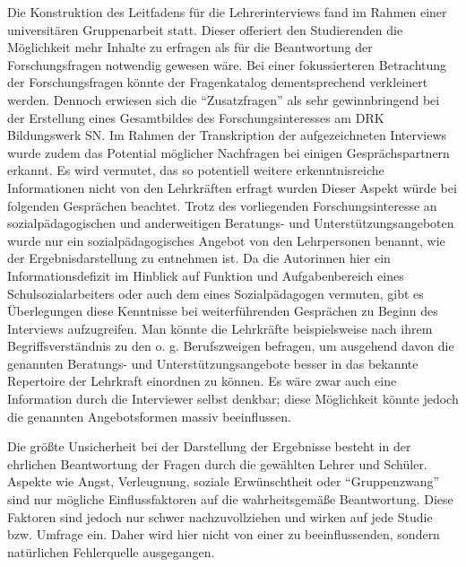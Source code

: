 Die  Konstruktion des Leitfadens für die Lehrerinterviews fand im Rahmen einer universitären Gruppenarbeit statt. Dieser offeriert den Studierenden die Möglichkeit mehr Inhalte zu erfragen als für die Beantwortung der Forschungsfragen notwendig gewesen wäre. Bei einer fokussierteren Betrachtung  der Forschungsfragen könnte der Fragenkatalog dementsprechend verkleinert werden. Dennoch erwiesen sich die "`Zusatzfragen"' als sehr gewinnbringend bei der Erstellung eines Gesamtbildes des Forschungsinteresses am DRK Bildungswerk SN. Im Rahmen der Transkription der aufgezeichneten Interviews wurde zudem das Potential möglicher Nachfragen bei einigen Gesprächspartnern erkannt. Es wird vermutet, das so potentiell weitere erkenntnisreiche Informationen nicht von den Lehrkräften erfragt wurden Dieser Aspekt würde bei folgenden Gesprächen beachtet. Trotz des vorliegenden Forschungsinteresse an sozialpädagogischen und anderweitigen Beratungs- und Unterstützungsangeboten wurde nur ein sozialpädagogisches Angebot von den Lehrpersonen benannt, wie der Ergebnisdarstellung zu entnehmen ist. Da die Autorinnen hier ein Informationsdefizit im Hinblick auf Funktion und Aufgabenbereich eines Schulsozialarbeiters oder auch dem eines Sozialpädagogen vermuten, gibt es Überlegungen diese Kenntnisse bei weiterführenden Gesprächen zu Beginn des Interviews aufzugreifen. Man könnte die Lehrkräfte beispielsweise nach ihrem Begriffsverständnis zu den o. g. Berufszweigen befragen, um ausgehend davon die genannten Beratungs- und Unterstützungsangebote besser in das bekannte Repertoire der Lehrkraft einordnen zu können. Es wäre zwar auch eine Information durch die Interviewer selbst denkbar; diese Möglichkeit könnte jedoch die genannten Angebotsformen massiv beeinflussen.

Die größte Unsicherheit bei der Darstellung der Ergebnisse besteht in der ehrlichen Beantwortung der Fragen durch die gewählten Lehrer und Schüler. Aspekte wie Angst, Verleugnung, soziale Erwünschtheit oder "`Gruppenzwang"' sind nur mögliche Einflussfaktoren auf die wahrheitsgemäße Beantwortung. Diese Faktoren sind jedoch nur schwer nachzuvollziehen und wirken auf jede Studie bzw. Umfrage ein. Daher wird hier nicht von einer zu beeinflussenden, sondern natürlichen Fehlerquelle ausgegangen.

